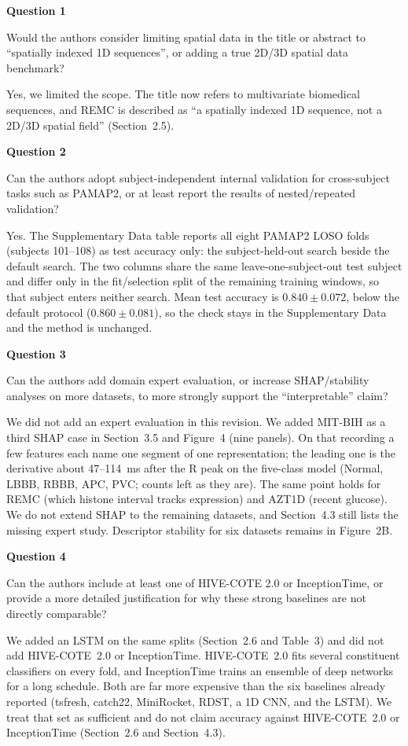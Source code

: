 \documentclass[11pt]{article}
\makeatletter
\newcommand{\rsp}{\par\vspace{0.9em}}
\newcommand{\rcitem}[2]{\begin{reviewerbox}\textbf{#1}\par\smallskip#2\end{reviewerbox}}
\newcommand{\response}[2]{%
  \begin{responsebox}#1%
  \def\@responseitems{#2}%
  \ifx\@responseitems\empty\else\begin{itemize}[nosep,leftmargin=1.2em]#2\end{itemize}\fi
  \end{responsebox}\rsp}
\makeatother
\begin{document}
\rcitem{Question 1}{Would the authors consider limiting spatial data in the title or abstract to
``spatially indexed 1D sequences'', or adding a true 2D/3D spatial data benchmark?}

\response{Yes, we limited the scope. The title now refers to multivariate biomedical sequences, and
REMC is described as ``a spatially indexed 1D sequence, not a 2D/3D spatial field'' (Section~2.5).}{}

\rcitem{Question 2}{Can the authors adopt subject-independent internal validation for cross-subject
tasks such as PAMAP2, or at least report the results of nested/repeated validation?}

\response{Yes. The Supplementary Data table reports all eight PAMAP2 LOSO folds (subjects 101--108)
as test accuracy only: the subject-held-out search beside the default search. The two columns share
the same leave-one-subject-out test subject and differ only in the fit/selection split of the
remaining training windows, so that subject enters neither search. Mean test accuracy is
$0.840\pm0.072$, below the default protocol ($0.860\pm0.081$), so the check stays in the
Supplementary Data and the method is unchanged.}{}

\rcitem{Question 3}{Can the authors add domain expert evaluation, or increase SHAP/stability analyses
on more datasets, to more strongly support the ``interpretable'' claim?}

\response{We did not add an expert evaluation in this revision. We added MIT-BIH as a third SHAP
case in Section~3.5 and Figure~4 (nine panels). On that recording a few features each name one
segment of one representation; the leading one is the derivative about 47--114~ms after the R peak
on the five-class model (Normal, LBBB, RBBB, APC, PVC; counts left as they are). The same point holds for REMC (which histone interval tracks
expression) and AZT1D (recent glucose). We do not extend SHAP to the remaining datasets, and
Section~4.3 still lists the missing expert study. Descriptor stability for six datasets remains in
Figure~2B.}{}

\rcitem{Question 4}{Can the authors include at least one of HIVE-COTE 2.0 or InceptionTime, or provide
a more detailed justification for why these strong baselines are not directly comparable?}

\response{We added an LSTM on the same splits (Section~2.6 and Table~3) and did not add HIVE-COTE~2.0
or InceptionTime. HIVE-COTE~2.0 fits several constituent classifiers on every fold, and InceptionTime
trains an ensemble of deep networks for a long schedule. Both are far more expensive than the six
baselines already reported (tsfresh, catch22, MiniRocket, RDST, a 1D CNN, and the LSTM). We treat
that set as sufficient and do not claim accuracy against HIVE-COTE~2.0 or InceptionTime
(Section~2.6 and Section~4.3).}{}
\end{document}
